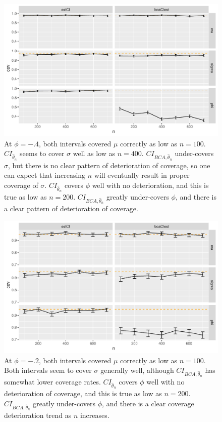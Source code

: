 \documentclass[12pt, letterpaper, titlepage]{article}
\begin{document}
\begin{figure}[tbp]
  \centering
  \includegraphics[width=\textwidth]{figures/plot_n.4}
  \caption{At $\phi = -.4$, both intervals covered $\mu$ correctly as low as
    $n = 100$. $CI_{\hat{\theta}_{n}}$ seems to cover $\sigma$ well as low as
    $n = 400$. $CI_{BCA, \hat{\theta}_{n}}$ under-covers $\sigma$, but there
    is no clear pattern of deterioration of coverage, so one can expect that
    increasing $n$ will eventually result in proper coverage of $\sigma$.
    $CI_{\hat{\theta}_{n}}$ covers $\phi$ well with no deterioration, and this
    is true as low as $n = 200$. $CI_{BCA, \hat{\theta}_{n}}$ greatly
    under-covers $\phi$, and there is a clear pattern of deterioration of
    coverage.}
  \label{fig:plot_n.4}
\end{figure}


\begin{figure}[tbp]
  \centering
  \includegraphics[width=\textwidth]{figures/plot_n.2}
  \caption{At $\phi = -.2$, both intervals covered $\mu$ correctly as low as
    $n = 100$. Both intervals seem to cover $\sigma$ generally well, although
    $CI_{BCA, \hat{\theta}_{n}}$ has somewhat lower coverage rates.
    $CI_{\hat{\theta}_{n}}$ covers $\phi$ well with no deterioration of
    coverage, and this is true as low as $n = 200$.
    $CI_{BCA, \hat{\theta}_{n}}$ greatly under-covers $\phi$, and there is a
    clear coverage deterioration trend as $n$ increases.}
  \label{fig:plot_n.2}
\end{figure}
\end{document}
